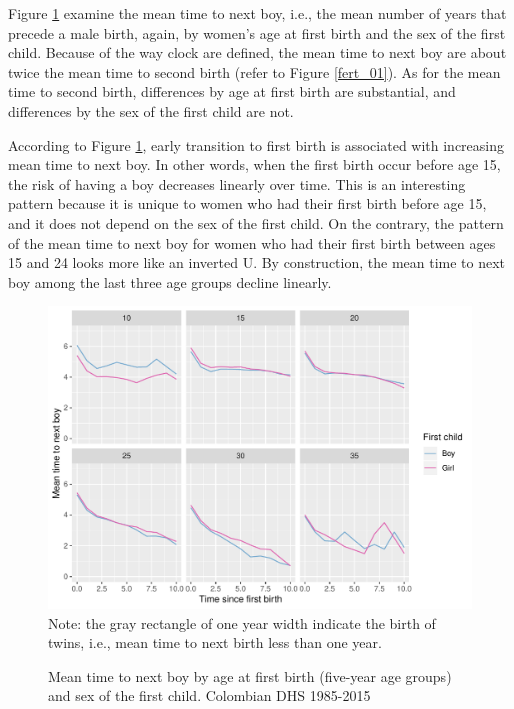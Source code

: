 \documentclass{article}
\begin{document}
Figure \ref{fert_02} examine the mean time to next boy, i.e., the mean number of years that precede a male birth, again, by women's age at first birth and the sex of the first child. Because of the way clock are defined, the mean time to next boy are about twice the mean time to second birth (refer to Figure \ref{fert_01}). As for the mean time to second birth, differences by age at first birth are substantial, and differences by the sex of the first child are not.

According to Figure \ref{fert_02}, early transition to first birth is associated with increasing mean time to next boy. In other words, when the first birth occur before age 15, the risk of having a boy decreases linearly over time. This is an interesting pattern because it is unique to women who had their first birth before age 15, and it does not depend on the sex of the first child. On the contrary, the pattern of the mean time to next boy for women who had their first birth between ages 15 and 24 looks more like an inverted U. By construction, the mean time to next boy among the last three age groups decline linearly.

\begin{figure}[H]
 \centering
    \caption{Mean time to next boy by age at first birth (five-year age groups) and sex of the first child. Colombian DHS 1985-2015}
    \includegraphics[scale=0.8]{Spells/Figures/mt_second_boy_by_sex_first_cohort.pdf}\\
    \label{fert_02}
    Note: the gray rectangle of one year width indicate the birth of twins, i.e., mean time to next birth less than one year.
\end{figure}
\end{document}

